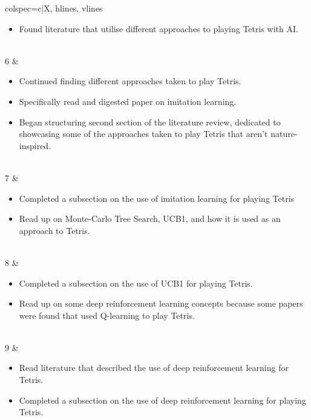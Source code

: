 \documentclass[a4paper, 12pt]{extreport}
\begin{document}
\begin{longtblr}[
				caption = Weekly breakdown of work done for Literature Review Chapter.
				]{colspec={c|X}, hlines, vlines}
\begin{varwidth}[t]{\linewidth}
\begin{itemize}[topsep=0pt,parsep=0pt]
						\item Found literature that utilise different approaches to playing Tetris with AI.
					\end{itemize}
				\end{varwidth}\\
				6 & \begin{varwidth}[t]{\linewidth}
					\begin{itemize}[topsep=0pt,parsep=0pt]
						\item Continued finding different approaches taken to play Tetris.
						\item Specifically read and digested paper on imitation learning.
						\item Began structuring second section of the literature review, dedicated to showcasing some of the approaches taken to play Tetris that aren't nature-inspired.
					\end{itemize}
				\end{varwidth}\\
				7 & \begin{varwidth}[t]{\linewidth}
					\begin{itemize}[topsep=0pt,parsep=0pt]
						\item Completed a subsection on the use of imitation learning for playing Tetris
						\item Read up on Monte-Carlo Tree Search, UCB1, and how it is used as an approach to Tetris.
					\end{itemize}
				\end{varwidth}\\
				8 & \begin{varwidth}[t]{\linewidth}
					\begin{itemize}[topsep=0pt,parsep=0pt]
						\item Completed a subsection on the use of UCB1 for playing Tetris.
						\item Read up on some deep reinforcement learning concepts because some papers were found that used Q-learning to play Tetris.
					\end{itemize}
				\end{varwidth}\\
				9 & \begin{varwidth}[t]{\linewidth}
					\begin{itemize}[topsep=0pt,parsep=0pt]
						\item Read literature that described the use of deep reinforcement learning for Tetris.
						\item Completed a subsection on the use of deep reinforcement learning for playing Tetris.

\end{itemize}
\end{varwidth}
\end{longtblr}
\end{document}
